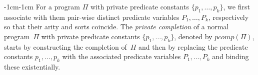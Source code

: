 \documentclass[11pt]{article}
\def\beq{\begin{equation}}
\def\eeq#1{\label{#1}\end{equation}}
\begin{document}
\begin{adjustwidth}{-1cm}{-1cm}
For a program $\Pi$ with private predicate constants $\{p_1,\dots,p_k\}$, we first associate with them pair-wise distinct predicate variables $P_1,\dots,P_k$, respectively so that their arity and sorts coincide. 
The \emph{private completion} of a normal program~$\Pi$ with private predicate constants $\{p_1,\dots,p_k\}$, denoted by $\mathit{pcomp}(\Pi)$,
starts by constructing 
 the completion of~$\Pi$ and then
  by replacing the predicate constants $p_1,\dots,p_k$ with the associated predicate variables $P_1,\dots,P_k$ and binding these existentially.
  
  

\end{adjustwidth}
\end{document}
